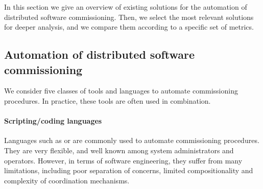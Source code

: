 


In this section we give an overview of existing solutions for the
automation of distributed software commissioning. Then, we select the
most relevant solutions for deeper analysis, and we compare them
according to a specific set of metrics.

\subsection{Automation of distributed software commissioning}
\label{sec:rwclasses}

We consider five classes of tools and languages to automate
commissioning procedures. In practice, these tools are often used in
combination.

\paragraph{Scripting/coding languages}
Languages such as \shell or \ruby are commonly used to automate
commissioning procedures. They are very flexible, and well known among
system administrators and operators. However, in terms of software
engineering, they suffer from many limitations, including poor
separation of concerns, limited compositionality and complexity of
coordination mechanisms.

